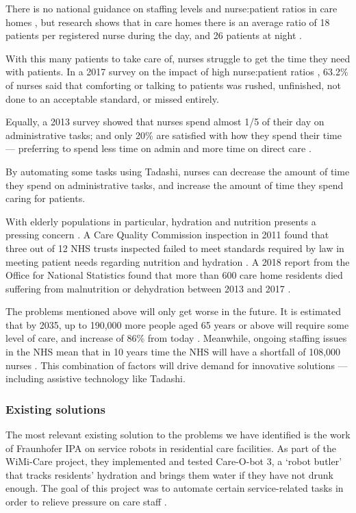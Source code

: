 \documentclass{article}
\begin{document}
There is no national guidance on staffing levels and nurse:patient ratios in care homes \cite{rcnstaffingadvice}, but research shows that in care homes there is an average ratio of 18 patients per registered nurse during the day, and 26 patients at night \cite{rcnstaffingguidance}.

With this many patients to take care of, nurses struggle to get the time they need with patients. In a 2017 survey on the impact of high nurse:patient ratios \cite{unison}, 63.2\% of nurses said that comforting or talking to patients was rushed, unfinished, not done to an acceptable standard, or missed entirely.

Equally, a 2013 survey showed that nurses spend almost 1/5 of their day on administrative tasks; and only 20\% are satisfied with how they spend their time --- preferring to spend less time on admin and more time on direct care \cite{rcnpol}.

By automating some tasks using Tadashi, nurses can decrease the amount of time they spend on administrative tasks, and increase the amount of time they spend caring for patients. 

With elderly populations in particular, hydration and nutrition presents a pressing concern \cite{hydrate}. A Care Quality Commission inspection in 2011 found that three out of 12 NHS trusts inspected failed to meet standards required by law in meeting patient needs regarding nutrition and hydration \cite{cqc}. A 2018 report from the Office for National Statistics found that more than 600 care home residents died suffering from malnutrition or dehydration between 2013 and 2017 \cite{ons}.

The problems mentioned above will only get worse in the future. It is estimated that by 2035, up to 190,000 more people aged 65 years or above will require some level of care, and increase of 86\% from today \cite{lancet}. Meanwhile, ongoing staffing issues in the NHS mean that in 10 years time the NHS will have a shortfall of 108,000 nurses \cite{nuffield}. This combination of factors will drive demand for innovative solutions --- including assistive technology like Tadashi.


\subsubsection{Existing solutions}
The most relevant existing solution to the problems we have identified is the work of Fraunhofer IPA on service robots in residential care facilities. As part of the WiMi-Care project, they implemented and tested Care-O-bot 3, a `robot butler' that tracks residents' hydration and brings them water if they have not drunk enough. The goal of this project was to automate certain service-related tasks in order to relieve pressure on care staff \cite{fraunhofer}.
\end{document}
